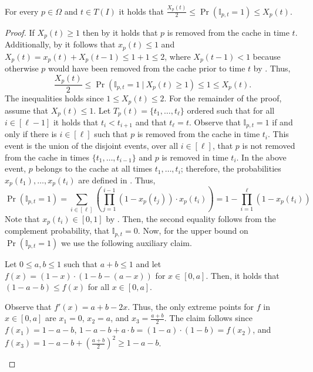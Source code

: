 \documentclass[11pt]{article}
\newcommand{\op}{{\mathbb{I}_{p,t}}}
\newcommand{\om}{{\Omega}}
\begin{document}
{	\begin{lemma}
	\label{lem:SAP}
	For every $p \in \om$ and $t \in T(I)$ it holds that $\frac{X_p(t)}{2}\leq \Pr \left(   \op = 1 \right) \leq X_p(t)$.
\end{lemma}

\begin{proof}
	If $X_p(t)\geq1$ then by  it holds that $p$ is removed from the cache in time $t$. Additionally, by  it follows that $x_p(t) \leq 1$ and $X_p(t) = x_p(t)+X_p(t-1) \leq 1+1 \leq 2$, where $X_p(t-1) < 1$ because otherwise $p$ would have been removed from the cache prior to time $t$ by . Thus, $$\frac{X_p(t)}{2} \leq \Pr \left(   \op = 1 ~|~ X_p(t)\geq1\right) \leq 1 \leq X_p(t).$$
	The inequalities holds since $1 \leq X_p(t)\leq 2$. For the remainder of the proof, assume that $X_p(t)\leq1$.  
	Let $T_p(t) = \{t_1,\ldots,t_{\ell}\}$ ordered such that for all $i \in [\ell-1]$ it holds that $t_{i}<t_{i+1}$ and that $t_{\ell} = t$. Observe that $\op = 1$ if and only if there is $i \in [\ell]$ such that $p$ is removed from the cache in time $t_i$. This event is the union of the disjoint events, over all $i \in [\ell]$, that $p$ is not removed from the cache in times $\{t_1,\ldots,t_{i-1}\}$ and $p$ is removed in time $t_i$. In the above event, $p$ belongs to the cache at all times $t_1,\ldots, t_i$; therefore, the probabilities $x_p(t_1),\ldots,x_p(t_i)$ are defined in . Thus, 
	\begin{equation}
		\label{eq:Nprob}
		\Pr \left(   \op = 1 \right) = \sum_{i \in [\ell]} \left( \prod_{j = 1}^{i-1} \left( 1- x_p(t_j) \right) \cdot x_p(t_i) \right) =  1- \prod_{i = 1}^{\ell} \left( 1-x_p(t_i) \right) 
	\end{equation} Note that $x_p(t_i) \in [0,1]$ by . Then, the second equality follows from the complement probability, that $\op = 0$. Now, for the upper bound on $	\Pr \left(   \op = 1 \right) $ we use the following auxiliary claim. 
		\begin{claim}	
			\label{clm:a}
			\label{claim:ab}
		Let  $0 \leq a,b \leq 1$ such that $a+b \leq 1$ and let $f(x) = (1-x) \cdot (1-b-(a-x))$ for $x \in [0,a]$. Then, it holds that $ (1-a-b) \leq f(x)$ for all $x \in [0,a]$.  
	\end{claim}
	\begin{claimproof}
		Observe that $f'(x) = a+b-2x$. Thus, the only extreme points for $f$ in $x \in[0,a]$ are $x_1 = 0$, $x_2 = a$, and $x_3  = \frac{a+b}{2}$. The claim follows since $f(x_1) = 1-a-b$, $1-a-b+a \cdot b = (1-a) \cdot (1-b) = f(x_2)$, and $f(x_3) = 1-a-b+\left(\frac{a+b}{2}\right)^2 \geq 1-a-b$. 
	\end{claimproof} 
	

\end{proof}}
\end{document}
